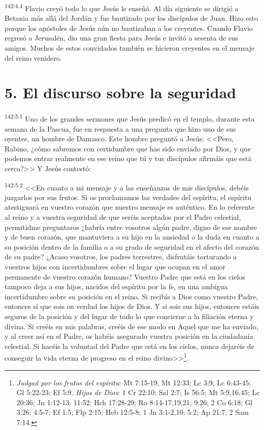 \par 
\textsuperscript{142:4.4} Flavio creyó todo lo que Jesús le enseñó. Al día siguiente se dirigió a Betania más allá del Jordán y fue bautizado por los discípulos de Juan. Hizo esto porque los apóstoles de Jesús aún no bautizaban a los creyentes. Cuando Flavio regresó a Jerusalén, dio una gran fiesta para Jesús e invitó a sesenta de sus amigos. Muchos de estos convidados también se hicieron creyentes en el mensaje del reino venidero.

\section*{5. El discurso sobre la seguridad}
\par 
\textsuperscript{142:5.1} Uno de los grandes sermones que Jesús predicó en el templo, durante esta semana de la Pascua, fue en respuesta a una pregunta que hizo uno de sus oyentes, un hombre de Damasco. Este hombre preguntó a Jesús: <<Pero, Rabino, ¿cómo sabremos con certidumbre que has sido enviado por Dios, y que podemos entrar realmente en ese reino que tú y tus discípulos afirmáis que está cerca?>> Y Jesús contestó:

\par 
\textsuperscript{142:5.2} <<En cuanto a mi mensaje y a las enseñanzas de mis discípulos, debéis juzgarlos por sus frutos. Si os proclamamos las verdades del espíritu, el espíritu atestiguará en vuestro corazón que nuestro mensaje es auténtico. En lo referente al reino y a vuestra seguridad de que seréis aceptados por el Padre celestial, permitidme preguntaros ¿habría entre vosotros algún padre, digno de ese nombre y de buen corazón, que mantuviera a su hijo en la ansiedad o la duda en cuanto a su posición dentro de la familia o a su grado de seguridad en el afecto del corazón de su padre? ¿Acaso vosotros, los padres terrestres, disfrutáis torturando a vuestros hijos con incertidumbres sobre el lugar que ocupan en el amor permanente de vuestro corazón humano? Vuestro Padre que está en los cielos tampoco deja a sus hijos, nacidos del espíritu por la fe, en una ambigua incertidumbre sobre su posición en el reino. Si recibís a Dios como vuestro Padre, entonces sí que sois en verdad los hijos de Dios. Y si sois sus hijos, entonces estáis seguros de la posición y del lugar de todo lo que concierne a la filiación eterna y divina. Si creéis en mis palabras, creéis de ese modo en Aquel que me ha enviado, y al creer así en el Padre, os habéis asegurado vuestra posición en la ciudadanía celestial. Si hacéis la voluntad del Padre que está en los cielos, nunca dejaréis de conseguir la vida eterna de progreso en el reino divino>>\footnote{\textit{Judgad por los frutos del espíritu}: Mt 7:15-19; Mt 12:33; Lc 3:9; Lc 6:43-45; Gl 5:22-23; Ef 5:9. \textit{Hijos de Dios}: 1 Cr 22:10; Sal 2:7; Is 56:5; Mt 5:9,16,45; Lc 20:36; Jn 1:12-13; 11:52; Hch 17:28-29; Ro 8:14-17,19,21; 9:26; 2 Co 6:18; Gl 3:26; 4:5-7; Ef 1:5; Flp 2:15; Heb 12:5-8; 1 Jn 3:1-2,10; 5:2; Ap 21:7; 2 Sam 7:14.}.

